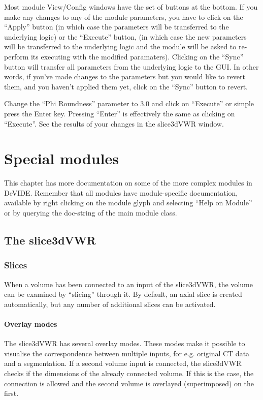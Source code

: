 Most module View/Config windows have the set of buttons at the
bottom.  If you make any changes to any of the module parameters, you
have to click on the ``Apply'' button (in which case the parameters
will be transferred to the underlying logic) or the ``Execute''
button, (in which case the new parameters will be transferred to the
underlying logic and the module will be asked to re-perform its
executing with the modified paramaters).  Clicking on the ``Sync''
button will transfer all parameters from the underlying logic to the
GUI.  In other words, if you've made changes to the parameters but you
would like to revert them, and you haven't applied them yet, click on
the ``Sync'' button to revert.

Change the ``Phi Roundness'' parameter to $3.0$ and click on
``Execute'' or simple press the Enter key.  Pressing ``Enter'' is
effectively the same as clicking on ``Execute''.  See the results of
your changes in the slice3dVWR window.

\chapter{Special modules}\label{secSpecialModules}
%
%
\setfooter{\thepage}{}{}{}{}{\thepage}%

This chapter has more documentation on some of the more complex
modules in DeVIDE.  Remember that all modules have module-specific
documentation, available by right clicking on the module glyph and
selecting ``Help on Module'' or by querying the doc-string of the main
module class.

\section{The slice3dVWR}\label{secslice3dVWR}

\subsection{Slices}\label{secSlices}
When a volume has been connected to an input of the slice3dVWR, the
volume can be examined by ``slicing'' through it.  By default, an
axial slice is created automatically, but any number of additional
slices can be activated.

\subsubsection{Overlay modes}
The slice3dVWR has several overlay modes.  These modes make it
possible to visualise the correspondence between multiple inputs, for
e.g. original CT data and a segmentation.  If a second volume input is
connected, the slice3dVWR checks if the dimensions of the already
connected volume.  If this is the case, the connection is allowed and
the second volume is overlayed (superimposed) on the first.

